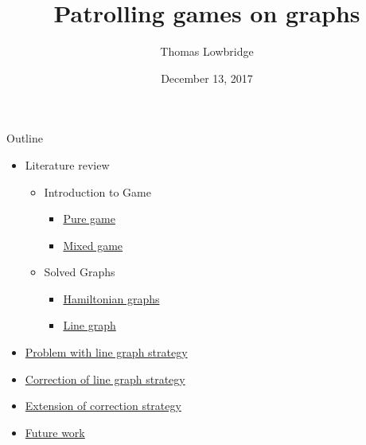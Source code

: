 \documentclass[11pt]{beamer}
\author{Thomas Lowbridge}
\title{Patrolling games on graphs}
\institute{University Of Nottingham}
\date{December 13, 2017}
\begin{document}
\hypertarget{Patrolling games}{}
\begin{frame}
\titlepage
\end{frame}


\begin{frame}{Outline}

\begin{itemize}
\item Literature review
 \begin{itemize}
 \item Introduction to Game
  \begin{itemize}
  \item \hyperlink{Introduction to game: Pure game}{Pure game}
  \item \hyperlink{Introduction to game: Mixed game}{Mixed game}
  \end{itemize}
 \item Solved Graphs
  \begin{itemize}
  \item \hyperlink{Solved graphs: Hamiltonian graphs}{Hamiltonian graphs}
  \item \hyperlink{Solved graphs: Line graph}{Line graph}
  \end{itemize}   
 \end{itemize}
\item \hyperlink{Problem with diametric strategy}{Problem with line graph strategy}
\item \hyperlink{Correction of diametric line graph strategy}{Correction of line graph strategy}
\item \hyperlink{Extension of correction strategy}{Extension of correction strategy}
\item \hyperlink{Future work}{Future work}
\end{itemize}
\end{frame}
\end{document}
